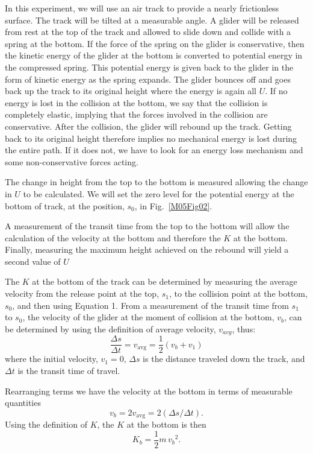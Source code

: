 In this experiment, we will use an air track to provide a nearly frictionless surface.  The track will be tilted at a measurable angle.  A glider will be released from rest at the top of the track and allowed to slide down and collide with a spring at the bottom. If the force of the spring on the glider is conservative, then the kinetic energy of the glider at the bottom is converted to potential energy in the compressed spring.  This potential energy is given back to the glider in the form of kinetic energy as the spring expands.  The glider bounces off and goes back up the track to its original height where the energy is again all $U$. If no energy is lost in the collision at the bottom, we say that the collision is completely elastic, implying that the forces involved in the collision are conservative.  After the collision, the glider will rebound up the track.  Getting back to its original height therefore implies no mechanical energy is lost during the entire path.  If it does not, we have to look for an energy loss mechanism and some non-conservative forces acting.

The change in height from the top to the bottom is measured allowing the change in $U$ to be calculated.  We will set the zero level for the potential energy at the bottom of track, at the position, $s_0$, in Fig.~\ref{M05Fig02}.

A measurement of the transit time from the top to the bottom will allow the calculation of the velocity at the bottom and therefore the $K$ at the bottom.  Finally, measuring the maximum height achieved on the rebound will yield a second value of $U$

The $K$ at the bottom of the track can be determined by measuring the average velocity from the release point at the top, $s_1$, to the collision point at the bottom, $s_0$, and then using Equation 1.  From a measurement of the transit time from $s_1$ to $s_0$, the velocity of the glider at the moment of collision at the bottom, $v_b$, can be determined by using the definition of average velocity, $v_{avg}$, thus:
\[
\frac{\Delta s}{\Delta t}  = v_{\mbox{avg}} = \frac{1}{2} (v_{b}+v_1)
\]
where the initial velocity, $v_1 = 0$, $\Delta s$ is the distance traveled down the track, and $\Delta t$ is the transit time of travel.

Rearranging terms we have the velocity at the bottom in terms of measurable quantities
\begin{equation}
  v_b = 2 v_{\mbox{avg}} = 2 (\Delta s / \Delta t).
\end{equation}
Using the definition of $K$, the $K$ at the bottom is then
\begin{equation}
  K_b = \frac{1}{2} m\, {v_b}^2.
\end{equation}

